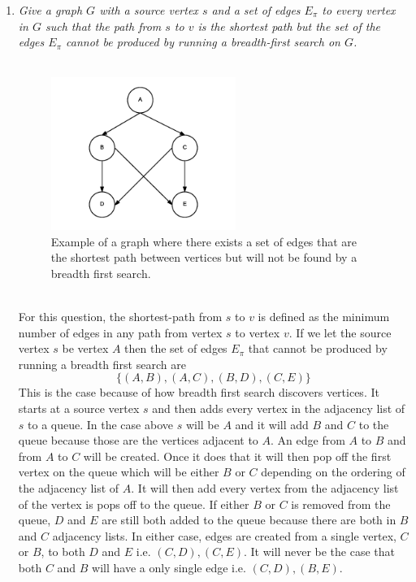\documentclass[12pt]{article}
\begin{document}
\begin{enumerate}
\begin{enumerate}
	\end{enumerate}
	\newpage
	\item \textit{Give a graph $G$ with a source vertex $s$ and a set of edges $E_\pi$ to every vertex in $G$ such that the path from $s$ to $v$ is the shortest
	path but the set of the edges $E_\pi$ cannot be produced by running a breadth-first search on $G$.} \\
	\\
	\begin{figure}[h]
	\caption{Example of a graph where there exists a set of edges that are the shortest path between vertices but will not be found by a breadth first search.}
	\includegraphics[width=6cm]{ps2_q2.png}
	\centering
	\end{figure}
	\\
	For this question, the shortest-path from $s$ to $v$ is defined as the minimum number of edges in any path from vertex $s$ to vertex $v$.  
	If we let the source vertex $s$ be vertex $A$ then the set of edges $E_\pi$ that cannot be produced by running a breadth first search are
	$$
	\{(A,B),(A,C),(B,D),(C,E)\}
	$$
	This is the case because of how breadth first search discovers vertices.  It starts at a source vertex $s$ and then adds every vertex in the adjacency list of $s$ to a queue.  
	In the case above $s$ will be $A$ and it will add $B$ and $C$ to the queue because those are the vertices adjacent to $A$.  
	An edge from $A$ to $B$ and from $A$ to $C$ will be created.  
	Once it does that it will then pop off the first vertex on the queue which will be either $B$ or $C$ depending on the ordering of the adjacency list of $A$.  
	It will then add every vertex from the adjacency list of the vertex is pops off to the queue.
	If either $B$ or $C$ is removed from the queue, $D$ and $E$ are still both added to the queue because there are both in $B$ and $C$ adjacency lists.
	In either case, edges are created from a single vertex, $C$ or $B$, to both $D$ and $E$ i.e. $(C,D),(C,E)$.  It will never be the case that both $C$ and $B$ will have a only single edge i.e. $(C,D),(B,E)$.

\end{enumerate}
\end{document}
